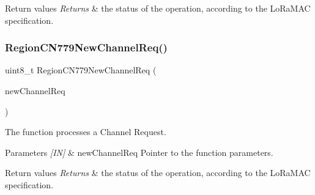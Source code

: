 \begin{DoxyRetVals}{Return values}
{\em Returns} & the status of the operation, according to the Lo\+Ra\+M\+AC specification. \\
\hline
\end{DoxyRetVals}
\mbox{\label{group__REGIONCN779_gab4c6ffa72f1da0e2ef40431ab7fd72fa}} 
\subsubsection{\texorpdfstring{Region\+C\+N779\+New\+Channel\+Req()}{RegionCN779NewChannelReq()}}
{\footnotesize\ttfamily uint8\+\_\+t Region\+C\+N779\+New\+Channel\+Req (\begin{DoxyParamCaption}\item[{\hyperlink{group__REGION_gae2abcdb6dbb843c9faf5fd3009eca9d6}{New\+Channel\+Req\+Params\+\_\+t} $\ast$}]{new\+Channel\+Req }\end{DoxyParamCaption})}



The function processes a Channel Request. 


\begin{DoxyParams}{Parameters}
{\em \mbox{[}\+I\+N\mbox{]}} & new\+Channel\+Req Pointer to the function parameters.\\
\hline
\end{DoxyParams}

\begin{DoxyRetVals}{Return values}
{\em Returns} & the status of the operation, according to the Lo\+Ra\+M\+AC specification. \\
\hline
\end{DoxyRetVals}
\mbox{\label{group__REGIONCN779_ga6506624bcb6ec8ae3e13e97d32301aaf}} 
